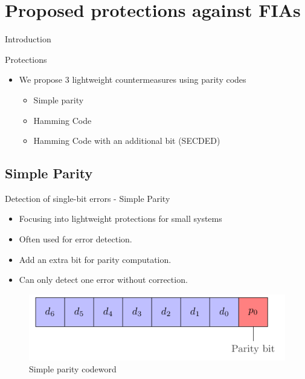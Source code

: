 \section{Proposed protections against FIAs}


\begin{frame}{Introduction}
    \begin{block}{Protections}
        \begin{itemize}
            \item We propose 3 lightweight countermeasures using parity codes
            \begin{itemize}
                \item Simple parity
                \item Hamming Code
                \item Hamming Code with an additional bit (SECDED)
            \end{itemize}
        \end{itemize}
    \end{block}
\end{frame}
\subsection{Simple Parity}
    \begin{frame}{Detection of single-bit errors - Simple Parity}
        \begin{block}{}
            \begin{itemize}
                \justifying
                \item Focusing into lightweight protections for small systems
                \item Often used for error detection.
                \item Add an extra bit for parity computation.
                \item Can only detect one error without correction.
            \end{itemize}
        \end{block}

        \vfill
        
        \begin{figure}
            \centering
            \includegraphics[width=.5\textwidth, page=1]{src/3_strategies/img/simple_parity.pdf}
            \caption{Simple parity codeword}
            \label{fig:simple_parity_codeword}
        \end{figure}
    \end{frame}

